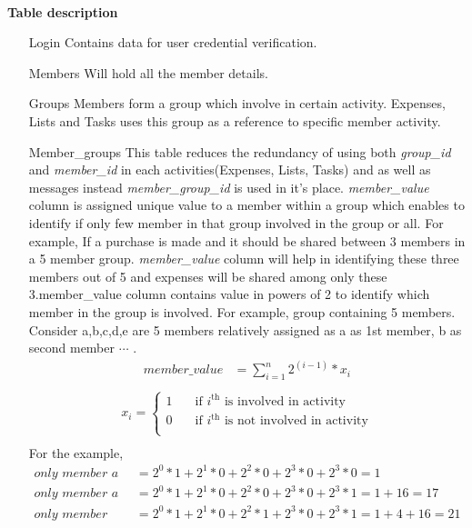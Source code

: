 \documentclass[11]{article}
\numberwithin{equation}{section}
\begin{document}
\ \\
\noindent \textbf{Table description} \\
\begin{enumerate}
\item[Login] Contains data for user credential verification.
\item[Members] Will hold all the member details.
\item[Groups] Members form a group which involve in certain activity. Expenses, Lists and Tasks uses this group as a reference to specific member activity.
\item[Member\_groups] This table reduces the redundancy of using both \emph{group\_id} and \emph{member\_id} in each activities(Expenses, Lists, Tasks) and as well as messages instead \emph{member\_group\_id} is used in it's place. \emph{member\_value} column is assigned unique value to a member within a group which enables to identify if only few member in that group involved in the group or all. For example, If a purchase is made and it should be shared between 3 members in a 5 member group. \emph{member\_value} column will help in identifying these three members out of 5 and expenses will be shared among only these 3.member\_value column contains value in powers of 2 to identify which member in the group is involved. For example, group containing 5 members. Consider a,b,c,d,e are 5 members relatively assigned as a as 1st member, b as second member $\cdots$ . 
\begin{align*}
\textit{member\_value}&=\displaystyle\sum_{i=1}^{n}2^{(i-1)}*x_i\\
\end{align*}
\begin{align*}
x_i =
  \begin{cases}
    1       & \quad \text{if } i^\text{th} \text{ is involved in activity}\\
    0  & \quad \text{if } i^\text{th} \text{ is not involved in activity}\\
  \end{cases} \\
\end{align*}
For the example,
\begin{align*}
\textit{only member a is involve}&=2^0*1+2^1*0+2^2*0+2^3*0+2^3*0=1\\
\textit{only member a and e is involve}&=2^0*1+2^1*0+2^2*0+2^3*0+2^3*1=1+16=17\\
\textit{only member a,c and e is involve}&=2^0*1+2^1*0+2^2*1+2^3*0+2^3*1=1+4+16=21\\

\end{align*}
\end{enumerate}
\end{document}
